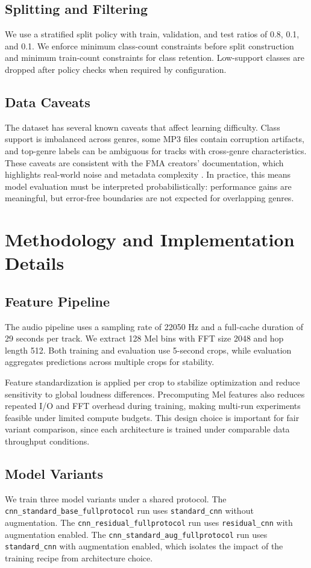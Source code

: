 \documentclass[11pt,a4paper]{article}
\begin{document}
\subsection{Splitting and Filtering}
We use a stratified split policy with train, validation, and test ratios of 0.8, 0.1, and 0.1. We enforce minimum class-count constraints before split construction and minimum train-count constraints for class retention. Low-support classes are dropped after policy checks when required by configuration.

\subsection{Data Caveats}
The dataset has several known caveats that affect learning difficulty. Class support is imbalanced across genres, some MP3 files contain corruption artifacts, and top-genre labels can be ambiguous for tracks with cross-genre characteristics. These caveats are consistent with the FMA creators' documentation, which highlights real-world noise and metadata complexity \cite{defferrard2017fma}. In practice, this means model evaluation must be interpreted probabilistically: performance gains are meaningful, but error-free boundaries are not expected for overlapping genres.

\section{Methodology and Implementation Details}
\subsection{Feature Pipeline}
The audio pipeline uses a sampling rate of 22050 Hz and a full-cache duration of 29 seconds per track. We extract 128 Mel bins with FFT size 2048 and hop length 512. Both training and evaluation use 5-second crops, while evaluation aggregates predictions across multiple crops for stability.

Feature standardization is applied per crop to stabilize optimization and reduce sensitivity to global loudness differences. Precomputing Mel features also reduces repeated I/O and FFT overhead during training, making multi-run experiments feasible under limited compute budgets. This design choice is important for fair variant comparison, since each architecture is trained under comparable data throughput conditions.

\subsection{Model Variants}
We train three model variants under a shared protocol. The \texttt{cnn\_standard\_base\_fullprotocol} run uses \texttt{standard\_cnn} without augmentation. The \texttt{cnn\_residual\_fullprotocol} run uses \texttt{residual\_cnn} with augmentation enabled. The \texttt{cnn\_standard\_aug\_fullprotocol} run uses \texttt{standard\_cnn} with augmentation enabled, which isolates the impact of the training recipe from architecture choice.
\end{document}
